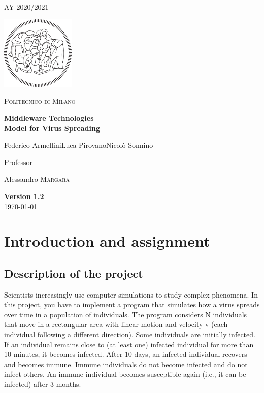 \documentclass[table, 12pt]{article}
\begin{document}
	\begin{titlepage}
		\centering
		{\scshape\large AY 2020/2021 \par}
		\vfill
		\includegraphics[width=100pt]{assets/logo_polimi.png}\par\vspace{1cm}
		{\scshape\LARGE Politecnico di Milano \par}
		\vspace{1.5cm}
		{\huge\bfseries Middleware Technologies\\Model for Virus Spreading\par}
		\vspace{2cm}
		{\Large {Federico Armellini\quad Luca Pirovano\quad Nicolò Sonnino}\par}
		\vfill
		{\large Professor\par
			Alessandro \textsc{Margara}}
		\vfill
		{\large \textbf{Version 1.2}\\ \today \par}
	\end{titlepage}
	\thispagestyle{plain}
	\mbox{}
	\newpage
	\tableofcontents
	\newpage
	
	
\section{Introduction and assignment}
\subsection{Description of the project}
Scientists increasingly use computer simulations to study complex phenomena. In this project, you have to
implement a program that simulates how a virus spreads over time in a population of individuals. The program
considers N individuals that move in a rectangular area with linear motion and velocity v (each individual
following a different direction). Some individuals are initially infected. If an individual remains close to (at least
one) infected individual for more than 10 minutes, it becomes infected. After 10 days, an infected individual
recovers and becomes immune. Immune individuals do not become infected and do not infect others. An
immune individual becomes susceptible again (i.e., it can be infected) after 3 months.
\end{document}
